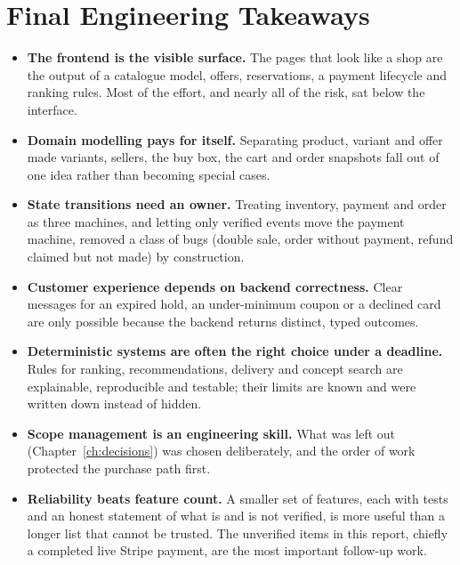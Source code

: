 \chapter{Final Engineering Takeaways}
\label{ch:conclusion}

\begin{itemize}
\item \textbf{The frontend is the visible surface.} The pages that look like a shop are the output of a catalogue model, offers, reservations, a payment lifecycle and ranking rules. Most of the effort, and nearly all of the risk, sat below the interface.
\item \textbf{Domain modelling pays for itself.} Separating product, variant and offer made variants, sellers, the buy box, the cart and order snapshots fall out of one idea rather than becoming special cases.
\item \textbf{State transitions need an owner.} Treating inventory, payment and order as three machines, and letting only verified events move the payment machine, removed a class of bugs (double sale, order without payment, refund claimed but not made) by construction.
\item \textbf{Customer experience depends on backend correctness.} Clear messages for an expired hold, an under-minimum coupon or a declined card are only possible because the backend returns distinct, typed outcomes.
\item \textbf{Deterministic systems are often the right choice under a deadline.} Rules for ranking, recommendations, delivery and concept search are explainable, reproducible and testable; their limits are known and were written down instead of hidden.
\item \textbf{Scope management is an engineering skill.} What was left out (Chapter~\ref{ch:decisions}) was chosen deliberately, and the order of work protected the purchase path first.
\item \textbf{Reliability beats feature count.} A smaller set of features, each with tests and an honest statement of what is and is not verified, is more useful than a longer list that cannot be trusted. The unverified items in this report, chiefly a completed live Stripe payment, are the most important follow-up work.
\end{itemize}
